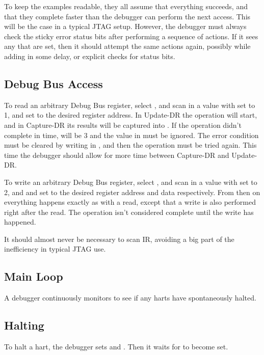 \documentclass{article}
\begin{document}
To keep the examples readable, they all assume that everything succeeds, and
that they complete faster than the debugger can perform the next access. This
will be the case in a typical JTAG setup. However, the debugger must always
check the sticky error status bits after performing a sequence of actions. If
it sees any that are set, then it should attempt the same actions again,
possibly while adding in some delay, or explicit checks for status bits.

\subsection{Debug Bus Access} \label{dbusaccess}

To read an arbitrary Debug Bus register, select \Rdbus, and scan in a value
with \Fop set to 1, and \Faddress set to the desired register address. In
Update-DR the operation will start, and in Capture-DR its results will be
captured into \Fdata.  If the operation didn't complete in time, \Fop will be 3
and the value in \Fdata must be ignored. The error condition must be cleared by
writing \Fdbusreset in \Rdtmcontrol, and then the operation must be tried
again. This time the debugger should allow for more time between Capture-DR and
Update-DR.

To write an arbitrary Debug Bus register, select \Rdbus, and scan in a value
with \Fop set to 2, and \Faddress and \Fdata set to the desired register
address and data respectively. From then on everything happens exactly as with
a read, except that a write is also performed right after the read. The
operation isn't considered complete until the write has happened.

It should almost never be necessary to scan IR, avoiding a big part of the
inefficiency in typical JTAG use.

\subsection{Main Loop}

A debugger continuously monitors \Rhaltsum to see if any harts have spontaneously
halted.

\subsection{Halting} \label{deb:halt}

To halt a hart, the debugger sets \Fhartid and \Fhalt. Then it waits for \Fhalt
to become set.
\end{document}

